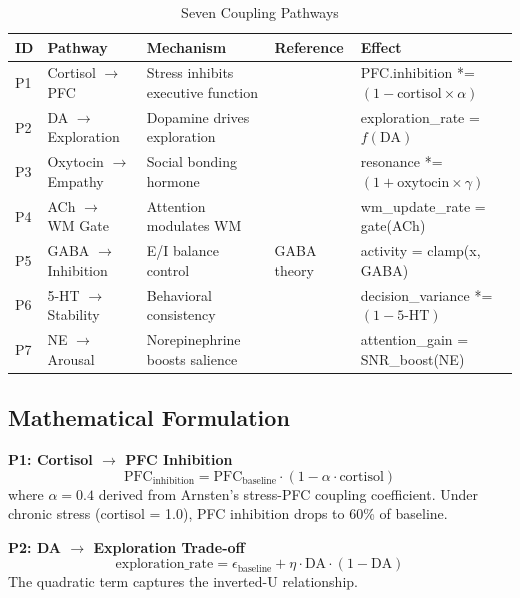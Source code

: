 \documentclass[preprint,12pt]{elsarticle}
\begin{document}
\begin{table}[htbp]
\centering
\caption{Seven Coupling Pathways}
\label{tab:pathways}
\begin{tabular}{lllll}
\toprule
\textbf{ID} & \textbf{Pathway} & \textbf{Mechanism} & \textbf{Reference} & \textbf{Effect} \\
\midrule
P1 & Cortisol $\rightarrow$ PFC & Stress inhibits executive function & \cite{arnsten2009} & PFC.inhibition *= $(1 - \text{cortisol} \times \alpha)$ \\
P2 & DA $\rightarrow$ Exploration & Dopamine drives exploration & \cite{schultz2007} & exploration\_rate = $f(\text{DA})$ \\
P3 & Oxytocin $\rightarrow$ Empathy & Social bonding hormone & \cite{dunbar2009} & resonance *= $(1 + \text{oxytocin} \times \gamma)$ \\
P4 & ACh $\rightarrow$ WM Gate & Attention modulates WM & \cite{hasselmo1999} & wm\_update\_rate = gate(ACh) \\
P5 & GABA $\rightarrow$ Inhibition & E/I balance control & GABA theory & activity = clamp(x, GABA) \\
P6 & 5-HT $\rightarrow$ Stability & Behavioral consistency & \cite{dayan2009} & decision\_variance *= $(1 - \text{5-HT})$ \\
P7 & NE $\rightarrow$ Arousal & Norepinephrine boosts salience & \cite{aston2005} & attention\_gain = SNR\_boost(NE) \\
\bottomrule
\end{tabular}
\end{table}

\subsection{Mathematical Formulation}

\textbf{P1: Cortisol $\rightarrow$ PFC Inhibition}
\begin{equation}
\text{PFC}_{\text{inhibition}} = \text{PFC}_{\text{baseline}} \cdot (1 - \alpha \cdot \text{cortisol})
\end{equation}
where $\alpha = 0.4$ derived from Arnsten's stress-PFC coupling coefficient. Under chronic stress (cortisol = 1.0), PFC inhibition drops to 60\% of baseline.

\textbf{P2: DA $\rightarrow$ Exploration Trade-off}
\begin{equation}
\text{exploration\_rate} = \epsilon_{\text{baseline}} + \eta \cdot \text{DA} \cdot (1 - \text{DA})
\end{equation}
The quadratic term captures the inverted-U relationship.
\end{document}
